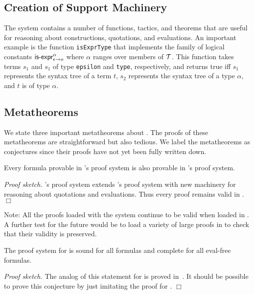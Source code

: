 \documentclass[fleqn]{llncs}
\begin{document}
\subsection{Creation of Support Machinery}\label{subsec:machinery}

The {\HLQE} system contains a number of {\HOL} functions, tactics, and
theorems that are useful for reasoning about constructions,
quotations, and evaluations.  An important example is the {\HOL}
function \texttt{isExprType} that implements the {\churchqe} family of
logical constants $\mbox{\sf is-expr}_{\epsilon \rightarrow o}^{\alpha}$
where $\alpha$ ranges over members of $\mbox{$\cal T$}$.  This function takes
terms $s_1$ and $s_1$ of type \texttt{epsilon} and \texttt{type},
respectively, and returns true iff $s_1$ represents the syntax tree of
a term $t$, $s_2$ represents the syntax tree of a type $\alpha$, and
$t$ is of type $\alpha$.

\subsection{Metatheorems}

We state three important metatheorems about {\HLQE}.  The proofs of
these metatheorems are straightforward but also tedious.  We label the
metatheorems as conjectures since their proofs have not yet been fully
written down.

\begin{conjecture}\bsp
Every formula provable in {\HL}'s proof system is also provable in
{\HLQE}'s proof system.\esp
\end{conjecture}

\noindent
\emph{Proof sketch.}  {\HLQE}'s proof system extends {\HL}'s proof
system with new machinery for reasoning about quotations and
evaluations. Thus every {\HL} proof remains valid in {\HLQE}. \hfill
$\Box$

\bigskip

\noindent
Note: All the proofs loaded with the {\HL} system continue to be valid
when loaded in {\HLQE}.  A further test for the future would be to
load a variety of large {\HL} proofs in {\HLQE} to check that their
validity is preserved.

\begin{conjecture}
The proof system for {\HLQE} is sound for all formulas and complete
for all eval-free formulas.
\end{conjecture}

\noindent
\emph{Proof sketch.}  The analog of this statement for {\churchqe} is
proved in~\cite{Farmer18}.  It should be possible to prove this
conjecture by just imitating the proof for {\churchqe}.  \hfill $\Box$
\end{document}
